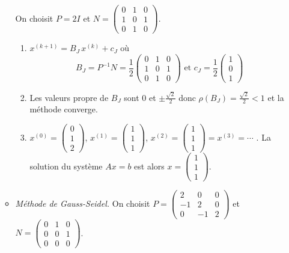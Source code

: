 \documentclass[a4paper]{article}
\begin{document}
\begin{enumerate}
\begin{itemize}
On choisit $P=2 I$ et $N=\left(\begin{array}{ccc}
0&1&0\\
1&0&1\\
0&1&0
\end{array}\right)$. 

\begin{enumerate}
\item  $x^{(k+1)}=B_J\,x^{(k)}+c_J$ où \[B_J=P^{-1}N=\frac 12\left(\begin{array}{ccc}
0&1&0\\
1&0&1\\
0&1&0
\end{array}\right)
\mbox{ et }c_J=\frac 12\left(\begin{array}{c}
1\\0\\1 
\end{array}\right)
\] 
\item Les valeurs propre de $B_J$ sont $0$ et $\pm\frac{\sqrt 2}2$ donc $\rho(B_J)=\frac{\sqrt 2}2<1$ et la méthode converge.
\item  $x^{(0)}=\left(\begin{array}{c}
0\\1\\2 
\end{array}\right)$, $x^{(1)}=\left(\begin{array}{c}
1\\1\\1 
\end{array}\right)$, $x^{(2)}=\left(\begin{array}{c}
1\\1\\1 
\end{array}\right)=x^{(3)}=\cdots$ . La solution du système $Ax=b$ est alors $x=\left(\begin{array}{c}
1\\1\\1 
\end{array}\right)$.
\end{enumerate}
\item {\it Méthode de Gauss-Seidel.} On choisit $P=\left(\begin{array}{ccc}
2&0&0\\
-1&2&0\\
0&-1&2
\end{array}\right)$ et $N=\left(\begin{array}{ccc}
0&1&0\\
0&0&1\\
0&0&0
\end{array}\right)$. 


\end{itemize}
\end{enumerate}
\end{document}
